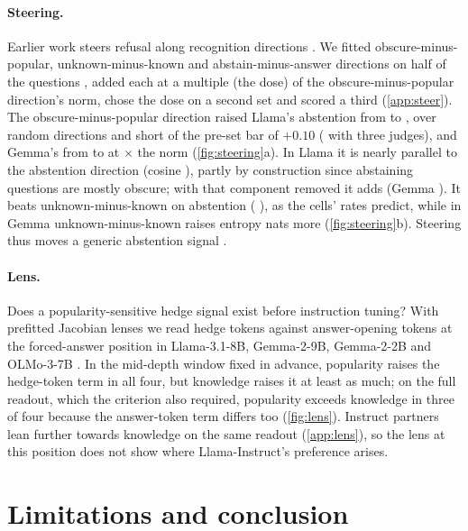 \documentclass{article}
\begin{document}
\paragraph{Steering.} Earlier work steers refusal along recognition directions \citep{ferrando2025iknow,brzezinka2026familiarity}. We fitted obscure-minus-popular, unknown-minus-known and abstain-minus-answer directions on half of the questions \citep{arditi2024refusal,rimsky2024caa}, added each at a multiple (the dose) of the obscure-minus-popular direction's norm, chose the dose on a second set and scored a third (\cref{app:steer}). The obscure-minus-popular direction raised Llama's abstention from \svLlamaNone{} to \svLlamaFam, \svLlamaDOne{} \svLlamaDOneCI{} over random directions and short of the pre-set bar of $+0.10$ (\svLlamaMajDOne{} with three judges), and Gemma's from \svGemmaNone{} to \svGemmaFam{} at \svGemmaDose$\times$ the norm (\cref{fig:steering}a). In Llama it is nearly parallel to the abstention direction (cosine \svLlamaCos), partly by construction since abstaining questions are mostly obscure; with that component removed it adds \svLlamaDTwo{} \svLlamaDTwoCI{} (Gemma \svGemmaDTwo{} \svGemmaDTwoCI). It beats unknown-minus-known on abstention (\svLlamaDThree{} \svLlamaDThreeCI), as the cells' rates predict, while in Gemma unknown-minus-known raises entropy \svGemmaDFour{} \svGemmaDFourCI{} nats more (\cref{fig:steering}b). Steering thus moves a generic abstention signal \citep[cf.][]{che2026steering}.

\paragraph{Lens.} Does a popularity-sensitive hedge signal exist before instruction tuning? With prefitted Jacobian lenses \citep{gurnee2026workspace} we read hedge tokens against answer-opening tokens at the forced-answer position in Llama-3.1-8B, Gemma-2-9B, Gemma-2-2B and OLMo-3-7B \citep{olmo3}. In the mid-depth window fixed in advance, popularity raises the hedge-token term in all four, but knowledge raises it at least as much; on the full readout, which the criterion also required, popularity exceeds knowledge in three of four because the answer-token term differs too (\cref{fig:lens}). Instruct partners lean further towards knowledge on the same readout (\cref{app:lens}), so the lens at this position does not show where Llama-Instruct's preference arises.

\section{Limitations and conclusion}
\end{document}
